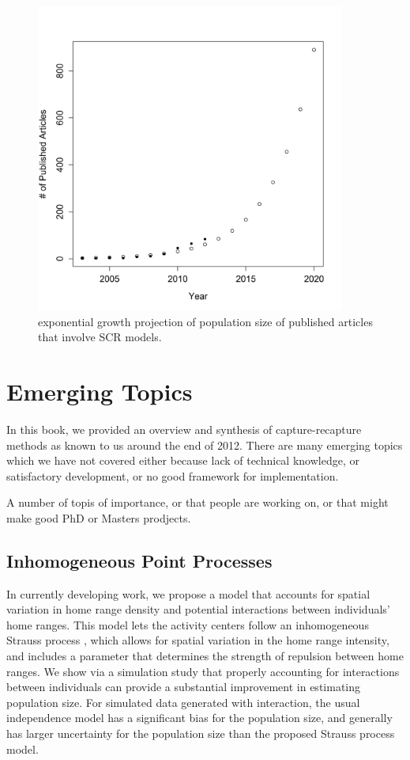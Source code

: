 \begin{figure}[ht]
\centering
\includegraphics[width=4in,height=4in]{Ch20-Last/exp_growth.png}
\caption{
exponential growth projection of population size of published articles
that involve SCR models. 
}
\label{last.fig.expgrowth}
\end{figure}



\section{Emerging Topics}


In this book, 
we provided an overview and synthesis of capture-recapture methods as
known to
us 
around the end of 2012. There 
are many emerging topics which we have not covered either because lack
of technical knowledge, or satisfactory development, or no good
framework for implementation.

A number of topis of importance, or that people are working on, or
that might make good PhD or Masters prodjects.


\subsection{Inhomogeneous Point Processes}

In currently developing work, we propose a model that accounts for
spatial variation in home range density and potential interactions
between individuals' home ranges.  This model lets the activity
centers follow an inhomogeneous Strauss process
\citep{strauss:1975,handbook:2010}, which allows for spatial variation
in the home range intensity, and includes a parameter that determines
the strength of repulsion between home ranges.  We show via a
simulation study that properly accounting for interactions between
individuals can provide a substantial improvement in estimating
population size.  For simulated data generated with interaction, the
usual independence model has a significant bias for the population
size, and generally has larger uncertainty for the population size
than the proposed Strauss process model.

